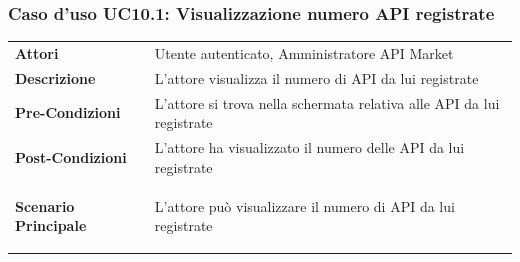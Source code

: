 \subsubsection{Caso d'uso UC10.1: Visualizzazione numero API registrate}
\label{UC10_1}

\begin{minipage}{\linewidth}
	\begin{tabular}{ l | p{11cm}}
		\hline
		\rowcolor{Gray}
		\multicolumn{2}{c}{UC10.1 - Visualizzazione numero API registrate} \\
		\hline
		\textbf{Attori} & Utente autenticato, Amministratore API Market \\
		\textbf{Descrizione} & L'attore visualizza il numero di API da lui registrate \\
		\textbf{Pre-Condizioni} & L'attore si trova nella schermata relativa alle API da lui registrate \\
		\textbf{Post-Condizioni} & L'attore ha visualizzato il numero delle API da lui registrate \\
		\textbf{Scenario Principale} & 
		\begin{enumerate*}[label=(\arabic*.),itemjoin={\newline}]
			\item L'attore può visualizzare il numero di API da lui registrate
		\end{enumerate*}\\
	\end{tabular}
\end{minipage}

\newpage
